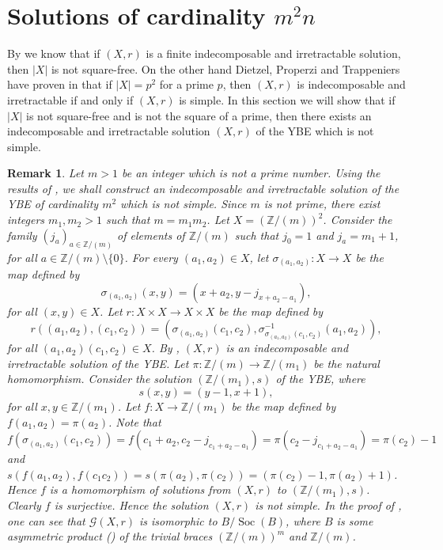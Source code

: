 \documentclass[10pt]{article}
\newtheorem{remark}[theorem]{Remark}
\newcommand{\Z}{\mathbb{Z}}
\newcommand{\soc}{\operatorname{Soc}}
\begin{document}
\section{Solutions of cardinality $m^2n$}\label{mixed}

By \cite[Theorem 4.5]{CO23} we know that if $(X,r)$ is a finite
indecomposable and irretractable solution, then $|X|$ is not
square-free. On the other hand Dietzel, Properzi and Trappeniers
have proven in \cite[page 17]{DPT} that if $|X|=p^2$ for a prime
$p$, then $(X,r)$ is indecomposable and irretractable if and only
if $(X,r)$ is simple. In this section we will show that if $|X|$
is not square-free and is not the square of a prime, then there
exists an indecomposable and irretractable solution $(X,r)$ of the
YBE which is not simple.

\begin{remark}
    {\rm Let $m>1$ be an integer which is not a prime number.
    Using the results of \cite{CO21}, we shall construct an indecomposable and
    irretractable solution of the YBE of cardinality $m^2$ which is not simple.
    Since $m$ is not prime, there exist integers $m_1,m_2>1$ such that $m=m_1m_2$.
    Let $X=(\Z/(m))^2$. Consider the family $(j_a)_{a\in\Z/(m)}$ of elements of
    $\Z/(m)$ such that $j_0=1$ and $j_a=m_1+1$, for all $a\in\Z/(m)\setminus\{ 0\}$.
    For every $(a_1,a_2)\in X$, let $\sigma_{(a_1,a_2)}\colon X\longrightarrow X$ be
    the map defined by
    $$\sigma_{(a_1,a_2)}(x,y)=(x+a_2, y-j_{x+a_2-a_1}),$$
    for all $(x,y)\in X$. Let $r\colon X\times X\longrightarrow X\times X$ be the map
    defined by
     $$r((a_1,a_2),(c_1,c_2))=(\sigma_{(a_1,a_2)}(c_1,c_2),\sigma^{-1}_{\sigma_{(a_1,a_2)}(c_1,c_2)}(a_1,a_2)),$$
     for all $(a_1,a_2)(c_1,c_2)\in X$. By \cite[Theorem 4.9]{CO21},
     $(X,r)$ is an indecomposable and irretractable solution of the YBE. Let $\pi\colon \Z/(m)\longrightarrow \Z/(m_1)$
     be the natural homomorphism. Consider the solution $(\Z/(m_1), s)$ of the YBE,
     where $$s(x,y)=(y-1,x+1),$$
     for all $x,y\in\Z/(m_1)$. Let $f\colon X\longrightarrow \Z/(m_1)$ be the map
     defined by $f(a_1,a_2)=\pi(a_2)$. Note that
     $$f(\sigma_{(a_1,a_2)}(c_1,c_2))=f(c_1+a_2,c_2-j_{c_1+a_2-a_1})=\pi(c_2-j_{c_1+a_2-a_1})=\pi(c_2)-1$$
     and $s(f(a_1,a_2),f(c_1c_2))=s(\pi(a_2),\pi(c_2))=(\pi(c_2)-1,\pi(a_2)+1)$.
     Hence $f$ is a homomorphism of solutions from $(X,r)$ to $(\Z/(m_1),s)$.
     Clearly $f$ is surjective. Hence the solution $(X,r)$ is not simple. In the proof of \cite[Proposition 6.2]{CO21}, one can see that $\mathcal{G}(X,r)$ is isomorphic to $B/\soc(B)$, where $B$ is some asymmetric product (\cite{CCS}) of the trivial braces $(\Z/(m))^m$ and $\Z/(m)$.}
\end{remark}
\end{document}
